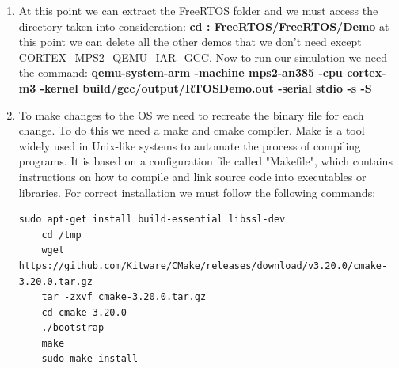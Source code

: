 \documentclass[9pt, reqno]{amsart}
\theoremstyle{definition}
\theoremstyle{remark}
\numberwithin{equation}{section}
\begin{document}
{\begin{enumerate}
    You need to create a new directory to store the toolchain files: \textbf{sudo mkdir /opt/gcc-arm-none-eabi}
    We extract the toolchain files in the specified directory: \textbf{sudo tar xf gcc-arm-none-eabi.tar.xz --strip-components=1 -C /opt/gcc-arm-none-eabi}
    We add the /opt/gcc-arm-none-eabi/bin directory to the PATH environment variable:\begin{lstlisting}[breaklines=true, basicstyle=\bfseries]
    echo 'export PATH=$PATH:/opt/gcc-arm-none-eabi/bin' | sudo tee -a /etc/profile.d/gcc-arm-none-eabi.sh"\end{lstlisting} 
    To make the changes made effective, we can log out and log in to the system or run the following command to immediately apply the changes: \textbf{source /etc/profile}.
    We can check the version of the compilers: \textbf{arm-none-eabi-gcc --version} \textbf{arm-none-eabi-g++ --version}.Remove unnecessary archive file: \textbf{rm -rf gcc-arm-none-eabi.tar.xz}.
    On Linux, the Arm GNU toolchain provides GDB with Python support. Requires version 3.8 to be installed, any other version may return errors. To install the correct version of Python the commands are: \textbf{sudo add-apt-repository ppa:deadsnakes/ppa} and \textbf{sudo apt install python3.8}.
    \item At this point we can extract the FreeRTOS folder and we must access the directory taken into consideration: \textbf{cd : FreeRTOS/FreeRTOS/Demo} at this point we can delete all the other demos that we don't need except CORTEX\_MPS2\_QEMU\_IAR\_GCC. Now to run our simulation we need the command: \textbf{qemu-system-arm -machine mps2-an385 -cpu cortex-m3 -kernel build/gcc/output/RTOSDemo.out -serial stdio -s -S}
    \item To make changes to the OS we need to recreate the binary file for each change. To do this we need a make and cmake compiler\cite{Cmake}. Make is a tool widely used in Unix-like systems to automate the process of compiling programs. It is based on a configuration file called "Makefile", which contains instructions on how to compile and link source code into executables or libraries. For correct installation we must follow the following commands:
    \begin{lstlisting}[breaklines=true, basicstyle=\bfseries,basicstyle=\small]
    sudo apt-get install build-essential libssl-dev
    cd /tmp
    wget https://github.com/Kitware/CMake/releases/download/v3.20.0/cmake-3.20.0.tar.gz
    tar -zxvf cmake-3.20.0.tar.gz
    cd cmake-3.20.0
    ./bootstrap
    make
    sudo make install\end{lstlisting}
\end{enumerate}


}
\end{document}
